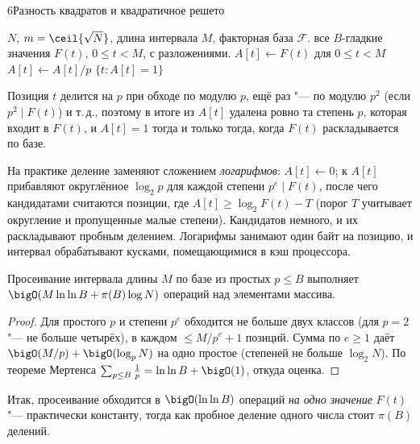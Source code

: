 \begin{lecture}{6}{Разность квадратов и квадратичное решето}
\begin{algorithm}\label{l6:sieve}
\begin{algorithmic}[1]
\Require $N$, $m = \ceil{\sqrt N}$, длина интервала $M$, факторная база $\mathcal F$.
\Ensure все $B$-гладкие значения $F(t)$, $0 \le t < M$, с разложениями.
\State $A[t] \gets F(t)$ для $0 \le t < M$
        \State $A[t] \gets A[t] / p$ 
      \EndFor
    \EndFor
  \EndFor
\EndFor
\State \Return $\{t : A[t] = 1\}$ 
\end{algorithmic}
\end{algorithm}

Позиция $t$ делится на $p$ при обходе по модулю $p$, ещё раз "--- по модулю $p^2$ (если
$p^2 \mid F(t)$) и т.\,д., поэтому в итоге из $A[t]$ удалена ровно та степень $p$, которая
входит в $F(t)$, и $A[t] = 1$ тогда и только тогда, когда $F(t)$ раскладывается по базе.

На практике деление заменяют сложением \emph{логарифмов}: $A[t] \gets 0$; к $A[t]$ прибавляют
округлённое $\log_2 p$ для каждой степени $p^e \mid F(t)$, после чего кандидатами считаются
позиции, где $A[t] \ge \log_2 F(t) - T$ (порог $T$ учитывает округление и пропущенные малые
степени). Кандидатов немного, и их раскладывают пробным делением. Логарифмы занимают один
байт на позицию, и интервал обрабатывают кусками, помещающимися в кэш процессора.

\begin{lemma}\label{l6:sieve-cost}
Просеивание интервала длины $M$ по базе из простых $p \le B$ выполняет
$\bigO(M \ln\ln B + \pi(B) \log N)$ операций над элементами массива.
\end{lemma}

\begin{proof}
Для простого $p$ и степени $p^e$ обходится не больше двух классов (для $p = 2$ "--- не больше
четырёх), в каждом $\le M/p^e + 1$ позиций. Сумма по $e \ge 1$ даёт
$\bigO(M/p) + \bigO(\log_p N)$ на одно простое (степеней не больше $\log_2 N$). По теореме Мертенса
$\sum_{p \le B} \frac 1p = \ln\ln B + \bigO(1)$, откуда оценка.
\end{proof}

Итак, просеивание обходится в $\bigO(\ln\ln B)$ операций \emph{на одно значение} $F(t)$ "---
практически константу, тогда как пробное деление одного числа стоит $\pi(B)$ делений.


\end{lecture}
